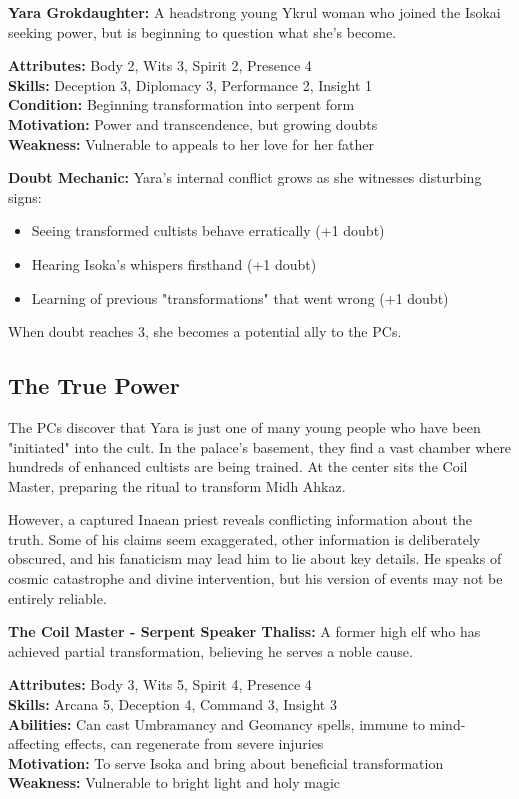 \documentclass[12pt,twoside]{article}
\begin{document}
\textbf{Yara Grokdaughter:}
A headstrong young Ykrul woman who joined the Isokai seeking power, but is beginning to question what she's become.

\textbf{Attributes:} Body 2, Wits 3, Spirit 2, Presence 4 \\
\textbf{Skills:} Deception 3, Diplomacy 3, Performance 2, Insight 1 \\
\textbf{Condition:} Beginning transformation into serpent form \\
\textbf{Motivation:} Power and transcendence, but growing doubts \\
\textbf{Weakness:} Vulnerable to appeals to her love for her father

\textbf{Doubt Mechanic:} Yara's internal conflict grows as she witnesses disturbing signs:
\begin{itemize}
  \item Seeing transformed cultists behave erratically (+1 doubt)
  \item Hearing Isoka's whispers firsthand (+1 doubt)
  \item Learning of previous "transformations" that went wrong (+1 doubt)
\end{itemize}
When doubt reaches 3, she becomes a potential ally to the PCs.

\subsection{The True Power}

The PCs discover that Yara is just one of many young people who have been "initiated" into the cult. In the palace's basement, they find a vast chamber where hundreds of enhanced cultists are being trained. At the center sits the Coil Master, preparing the ritual to transform Midh Ahkaz.

However, a captured Inaean priest reveals conflicting information about the truth. Some of his claims seem exaggerated, other information is deliberately obscured, and his fanaticism may lead him to lie about key details. He speaks of cosmic catastrophe and divine intervention, but his version of events may not be entirely reliable.

\textbf{The Coil Master - Serpent Speaker Thaliss:}
A former high elf who has achieved partial transformation, believing he serves a noble cause.

\textbf{Attributes:} Body 3, Wits 5, Spirit 4, Presence 4 \\
\textbf{Skills:} Arcana 5, Deception 4, Command 3, Insight 3 \\
\textbf{Abilities:} Can cast Umbramancy and Geomancy spells, immune to mind-affecting effects, can regenerate from severe injuries \\
\textbf{Motivation:} To serve Isoka and bring about beneficial transformation \\
\textbf{Weakness:} Vulnerable to bright light and holy magic
\end{document}
